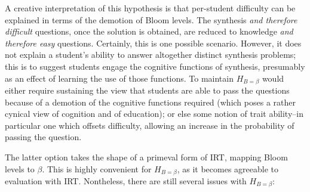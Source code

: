 \documentclass[a4paper,twocolumn]{article}
\begin{document}
A creative interpretation of this hypothesis is that per-student difficulty can
be explained in terms of the demotion of Bloom levels.  The synthesis \emph{and
therefore difficult} questions, once the solution is obtained, are reduced to
knowledge \emph{and therefore easy} questions.  Certainly, this is one possible
scenario.  However, it does not explain a student's ability to answer
altogether distinct synthesis problems; this is to suggest students engage the
cognitive functions of synthesis, presumably as an effect of learning the use
of those functions.  To maintain $H_{B=\beta}$ would either require sustaining
the view that students are able to pass the questions because of a demotion of
the cognitive functions required (which poses a rather cynical view of
cognition and of education); or else some notion of trait ability--in
particular one which offsets difficulty, allowing an increase in the
probability of passing the question.

The latter option takes the shape of a primeval form of IRT, mapping Bloom
levels to $\beta$.  This is highly convenient for $H_{B=\beta}$, as it becomes
agreeable to evaluation with IRT.  Nontheless, there are still several issues
with $H_{B=\beta}$:

\end{document}
